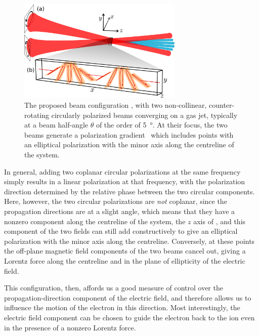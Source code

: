 \begin{figure}[htb]
  \centering
  \subfigure{\label{f8-field-configuration-beams}}
  \subfigure{\label{f8-field-configuration-ellipses}}
  \includegraphics[width=0.7\textwidth]{9-Nondipole-HHG/Figures/figure9B.png} 
  \caption[
  Proposed beam configuration for probing the Lorentz-force action: two non-collinear, counter-rotating circularly polarized beams of the same frequency, with the resulting field configuration showing forwards ellipticity
  ]{
  The proposed beam configuration \protect{}, with two non-collinear, counter-rotating circularly polarized beams converging on a gas jet, typically at a beam half-angle $\theta$ of the order of \SI{5}{\degree}. At their focus, the two beams generate a polarization gradient~\protect{} which includes points with an elliptical polarization with the minor axis along the centreline of the system.
  }
\label{f8-field-configuration}
\end{figure}



In general, adding two coplanar circular polarizations at the same frequency simply results in a linear polarization at that frequency, with the polarization direction determined by the relative phase between the two circular components. Here, however, the two circular polarizations are \textit{not} coplanar, since the propagation directions are at a slight angle, which means that they have a nonzero component along the centreline of the system, the $z$ axis of , and this component of the two fields can still add constructively to give an elliptical polarization with the minor axis along the centreline. Conversely, at these points the off-plane magnetic field components of the two beams cancel out, giving a Lorentz force along the centreline and in the plane of ellipticity of the electric field.

This configuration, then, affords us a good measure of control over the propagation-direction component of the electric field, and therefore allows us to influence the motion of the electron in this direction. Most interestingly, the electric field component can be chosen to guide the electron back to the ion even in the presence of a nonzero Lorentz force.

